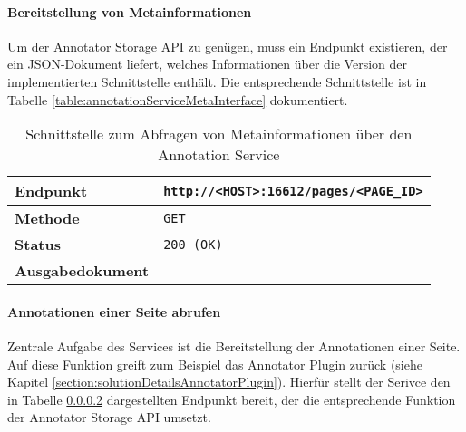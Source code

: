     \paragraph{Bereitstellung von Metainformationen}
    Um der Annotator Storage API zu genügen,
    muss ein Endpunkt existieren, der ein JSON-Dokument liefert,
    welches Informationen über die Version der implementierten Schnittstelle enthält.
    Die entsprechende Schnittstelle ist in Tabelle
    \ref{table:annotationServiceMetaInterface} dokumentiert.


    \begin{table}[htb]
        \centering
        \begin{tabular}{|l|l|}
            \hline
            \textbf{Endpunkt} & \texttt{http://<HOST>:16612/pages/<PAGE\_ID>}\\
            \hline
            \textbf{Methode} & \texttt{GET}\\
            \hline
            \textbf{Status} & \texttt{200 (OK)}\\
            \hline
            \textbf{Ausgabedokument} & \\
            \hline
        \end{tabular}
        \caption{Schnittstelle zum Abfragen von Metainformationen über den Annotation Service}
        \label{tableannotationServiceMetaInterface}
    \end{table}

    \paragraph{Annotationen einer Seite abrufen}
    Zentrale Aufgabe des Services ist die Bereitstellung der Annotationen einer Seite.
    Auf diese Funktion greift zum Beispiel das Annotator Plugin zurück
    (siehe Kapitel \ref{section:solutionDetailsAnnotatorPlugin}).
    Hierfür stellt der Serivce den in Tabelle \ref{}
    dargestellten Endpunkt bereit, der die entsprechende Funktion der Annotator Storage API
    umsetzt.
    
